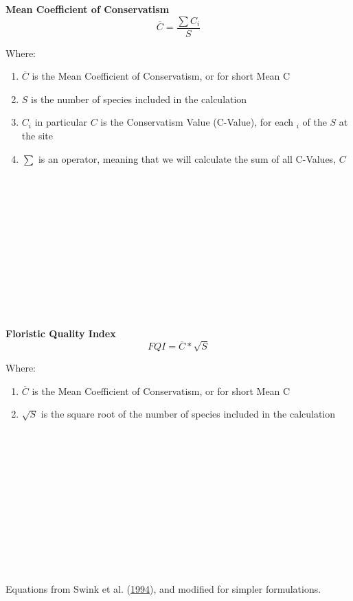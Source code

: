 \documentclass[
]{article}
\begin{document}
\textbf{Mean Coefficient of Conservatism} \\

\[
\overline{C} = \frac{\sum{} C_i}{S}
\]

Where:\\

\begin{enumerate}[nosep]
  \item[] $\overline{C}$ is the Mean Coefficient of Conservatism, or for short Mean C
  \item[] $S$ is the number of species included in the calculation  
  \item[] $C_i$ in particular $C$ is the Conservatism Value (C-Value), for each $_i$ of the $S$ at the site  
  \item[] $\sum{}$ is an operator, meaning that we will calculate the sum of all C-Values, $C$  
\end{enumerate}

\strut \\
\strut \\
\strut \\
\strut \\
\strut \\
\strut \\
\strut \\

\textbf{Floristic Quality Index} \\

\[
FQI = \overline{C} * \sqrt{S}
\]

Where:\\

\begin{enumerate}[nosep]
  \item[] $\overline{C}$ is the Mean Coefficient of Conservatism, or for short Mean C  
  \item[] $\sqrt{S}$ is the square root of the number of species included in the calculation  
\end{enumerate}

\strut \\
\strut \\
\strut \\
\strut \\
\strut \\
\strut \\
\strut \\

Equations from Swink et al.
(\protect\hyperlink{ref-swink1994plants}{1994}), and modified for
simpler formulations.
\end{document}
